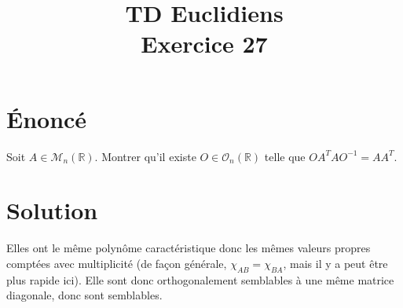 \documentclass[french]{article}
\title{TD Euclidiens\\ Exercice 27}
\date{}
\newcommand{\R}{\mathbb{R}}
\newcommand{\inv}{^{-1}}
\begin{document}
\maketitle

\section{Énoncé}
Soit $A\in\mathcal{M}_n(\R)$. Montrer qu'il existe $O\in\mathcal{O}_n(\R)$ telle que $OA^TAO\inv=AA^T$.
\section{Solution}
Elles ont le même polynôme caractéristique donc les mêmes valeurs propres comptées avec multiplicité (de façon générale, $\chi_{AB}=\chi_{BA}$, mais il y a peut être plus rapide ici). Elle sont donc orthogonalement semblables à une même matrice diagonale, donc sont semblables.
\end{document}
